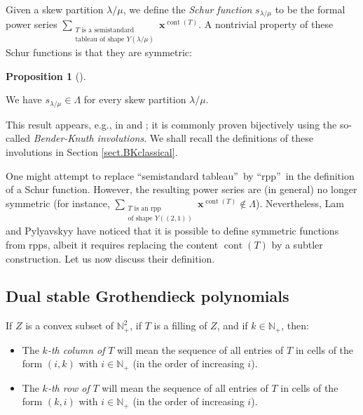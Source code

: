 \documentclass[numbers=enddot,12pt,final,onecolumn,notitlepage]{scrartcl}%
\theoremstyle{definition}
\newtheorem{prop}[theo]{Proposition}
\newenvironment{proposition}[1][]
{\begin{prop}[#1]\begin{leftbar}}
{\end{leftbar}\end{prop}}
\let\sumnonlimits\sum
\renewcommand{\sum}{\sumnonlimits\limits}
\begin{document}
Given a skew partition $\lambda/\mu$, we define the \textit{Schur function}
$s_{\lambda/\mu}$ to be the formal power series $\sum_{\substack{T\text{ is a
semistandard}\\\text{tableau of shape }Y\left(  \lambda/\mu\right)
}}\mathbf{x}^{\operatorname*{cont}\left(  T\right)  }$. A nontrivial property
of these Schur functions is that they are symmetric:

\begin{proposition}
\label{prop.schur.symm}We have $s_{\lambda/\mu}\in\Lambda$ for every skew
partition $\lambda/\mu$.
\end{proposition}

This result appears, e.g., in \cite[Theorem 7.10.2]{Stan99} and
\cite[Proposition 2.11]{GriRei15}; it is commonly proven bijectively using the
so-called \textit{Bender-Knuth involutions}. We shall recall the definitions
of these involutions in Section \ref{sect.BKclassical}.

One might attempt to replace \textquotedblleft semistandard
tableau\textquotedblright\ by \textquotedblleft rpp\textquotedblright\ in the
definition of a Schur function. However, the resulting power series are (in
general) no longer symmetric (for instance, $\sum_{\substack{T\text{ is an
rpp}\\\text{of shape }Y\left(  \left(  2,1\right)  \right)  }}\mathbf{x}%
^{\operatorname*{cont}\left(  T\right)  }\notin\Lambda$). Nevertheless, Lam
and Pylyavskyy \cite[\S 9]{LamPyl} have noticed that it is possible to define
symmetric functions from rpps, albeit it requires replacing the content
$\operatorname*{cont}\left(  T\right)  $ by a subtler construction. Let us now
discuss their definition.

\subsection{Dual stable Grothendieck polynomials}

If $Z$ is a convex subset of $\mathbb{N}_{+}^{2}$, if $T$ is a filling of $Z$,
and if $k\in\mathbb{N}_{+}$, then:

\begin{itemize}
\item The $k$\textit{-th column of }$T$ will mean the sequence of all entries
of $T$ in cells of the form $\left(  i,k\right)  $ with $i\in\mathbb{N}_{+}$
(in the order of increasing $i$).

\item The $k$\textit{-th row of }$T$ will mean the sequence of all entries of
$T$ in cells of the form $\left(  k,i\right)  $ with $i\in\mathbb{N}_{+}$ (in
the order of increasing $i$).
\end{itemize}
\end{document}

